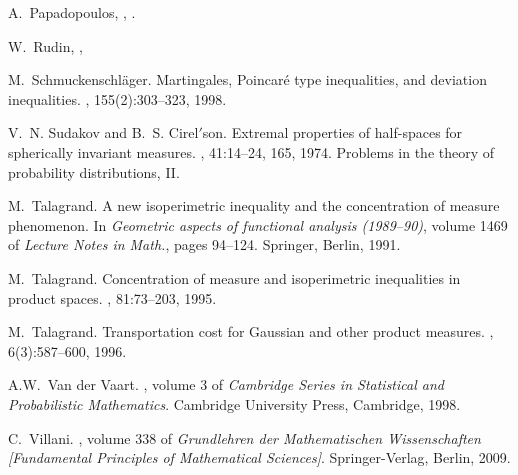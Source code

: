 \documentclass[11pt]{amsart}
\numberwithin{equation}{section}
\begin{document}
\begin{thebibliography}{10}
   A.~Papadopoulos,
    ,
    .
   
     {W.~Rudin},
     ,
  

M.~Schmuckenschl{\"a}ger.
\newblock Martingales, {P}oincar\'e type inequalities, and deviation
  inequalities.
, 155(2):303--323, 1998.

V.~N. Sudakov and B.~S. Cirel$'$son.
\newblock Extremal properties of half-spaces for spherically invariant
  measures.
, 41:14--24, 165, 1974.
\newblock Problems in the theory of probability distributions, II.

M.~Talagrand.
\newblock A new isoperimetric inequality and the concentration of measure
  phenomenon.
\newblock In {\em Geometric aspects of functional analysis (1989--90)}, volume
  1469 of {\em Lecture Notes in Math.}, pages 94--124. Springer, Berlin, 1991.

M.~Talagrand.
\newblock Concentration of measure and isoperimetric inequalities in product
  spaces.
, 81:73--203, 1995.

M.~Talagrand.
\newblock Transportation cost for {G}aussian and other product measures.
, 6(3):587--600, 1996.

A.W.~Van der Vaart.
, volume 3 of {\em
  Cambridge Series in Statistical and Probabilistic Mathematics}.
\newblock Cambridge University Press, Cambridge, 1998.

C.~Villani.
, volume 338 of {\em
  Grundlehren der Mathematischen Wissenschaften [Fundamental Principles of
  Mathematical Sciences]}.
\newblock Springer-Verlag, Berlin, 2009.

\end{thebibliography}
\end{document}
